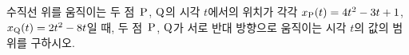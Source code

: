 수직선 위를 움직이는 두 점~$\mathrm{P}$, $\mathrm{Q}$의 시각 $t$에서의 위치가 각각 $x_{\mathrm{P}}(t)=4t^2-3t+1$, $x_{\mathrm{Q}}(t)=2t^2-8t$일 때, 두 점~$\mathrm{P}$, $\mathrm{Q}$가 서로 반대 방향으로 움직이는 시각 $t$의 값의 범위를 구하시오.
